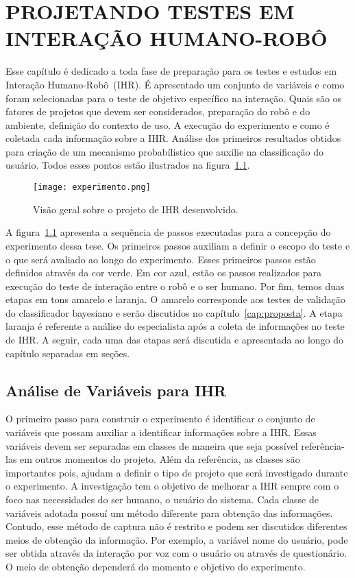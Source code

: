 \chapter{PROJETANDO TESTES EM INTERAÇÃO HUMANO-ROBÔ}
\label{cap:projetoihr}
Esse capítulo é dedicado a toda fase de preparação para os testes e estudos em Interação Humano-Robô~(IHR). É apresentado um conjunto de variáveis e como foram selecionadas para o teste de objetivo específico na interação. Quais são os fatores de projetos que devem ser considerados, preparação do robô e do ambiente, definição do contexto de uso. A execução do experimento e como é coletada cada informação sobre a IHR. Análise dos primeiros resultados obtidos para criação de um mecanismo probabílistico que auxilie na classificação do usuário. Todos esses pontos estão ilustrados na figura~\ref{fig:experimento}.

\begin{figure}[ht!]
	\centering
	\begin{minipage}{\textwidth}
		\caption{Visão geral sobre o projeto de IHR desenvolvido.}
		\texttt{[image: experimento.png]}
		\label{fig:experimento}
	\end{minipage}
\end{figure}

A figura~\ref{fig:experimento} apresenta a sequência de passos executadas para a concepção do experimento dessa tese. Os primeiros passos auxiliam a definir o escopo do teste e o que será avaliado ao longo do experimento. Esses primeiros passos estão definidos através da cor verde. Em cor azul, estão os passos realizados para execução do teste de interação entre o robô e o ser humano. Por fim, temos duas etapas em tons amarelo e laranja. O amarelo corresponde aos testes de validação do classificador bayesiano e serão discutidos no capítulo~\ref{cap:proposta}. A etapa laranja é referente a análise do especialista após a coleta de informações no teste de IHR. A seguir, cada uma das etapas será discutida e apresentada ao longo do capítulo separadas em seções.

\section{Análise de Variáveis para IHR}
\label{sec:variáveis}
O primeiro passo para construir o experimento é identificar o conjunto de variáveis que possam auxiliar a identificar informações sobre a IHR. Essas variáveis devem ser separadas em classes de maneira que seja possível referência-las em outros momentos do projeto. Além da referência, as classes são importantes pois, ajudam a definir o tipo de projeto que será investigado durante o experimento. A investigação tem o objetivo de melhorar a IHR sempre com o foco nas necessidades do ser humano, o usuário do sistema. Cada classe de variáveis adotada possuí um método diferente para obtenção das informações. Contudo, esse método de captura não é restrito e podem ser discutidos diferentes meios de obtenção da informação. Por exemplo, a variável nome do usuário, pode ser obtida através da interação por voz com o usuário ou através de questionário. O meio de obtenção dependerá do momento e objetivo do experimento.

